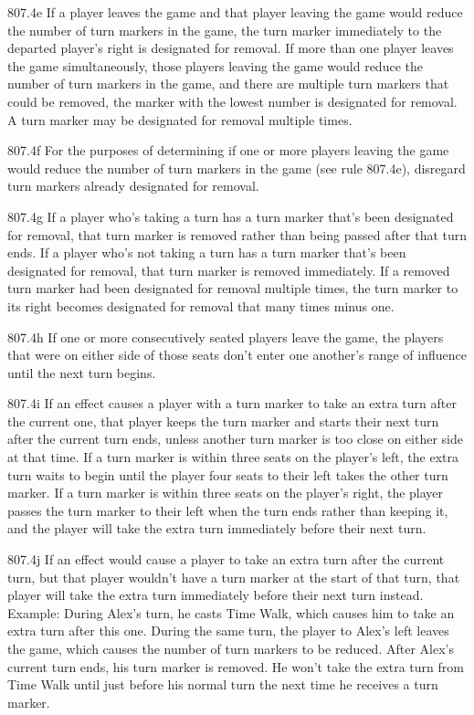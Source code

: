 807.4e If a player leaves the game and that player leaving the game would reduce the number of turn markers in the game, the turn marker immediately to the departed player’s right is designated for removal. If more than one player leaves the game simultaneously, those players leaving the game would reduce the number of turn markers in the game, and there are multiple turn markers that could be removed, the marker with the lowest number is designated for removal. A turn marker may be designated for removal multiple times.

807.4f For the purposes of determining if one or more players leaving the game would reduce the number of turn markers in the game (see rule 807.4e), disregard turn markers already designated for removal.

807.4g If a player who’s taking a turn has a turn marker that’s been designated for removal, that turn marker is removed rather than being passed after that turn ends. If a player who’s not taking a turn has a turn marker that’s been designated for removal, that turn marker is removed immediately. If a removed turn marker had been designated for removal multiple times, the turn marker to its right becomes designated for removal that many times minus one.

807.4h If one or more consecutively seated players leave the game, the players that were on either side of those seats don’t enter one another’s range of influence until the next turn begins.

807.4i If an effect causes a player with a turn marker to take an extra turn after the current one, that player keeps the turn marker and starts their next turn after the current turn ends, unless another turn marker is too close on either side at that time. If a turn marker is within three seats on the player’s left, the extra turn waits to begin until the player four seats to their left takes the other turn marker. If a turn marker is within three seats on the player’s right, the player passes the turn marker to their left when the turn ends rather than keeping it, and the player will take the extra turn immediately before their next turn.

807.4j If an effect would cause a player to take an extra turn after the current turn, but that player wouldn’t have a turn marker at the start of that turn, that player will take the extra turn immediately before their next turn instead.
Example: During Alex’s turn, he casts Time Walk, which causes him to take an extra turn after this one. During the same turn, the player to Alex’s left leaves the game, which causes the number of turn markers to be reduced. After Alex’s current turn ends, his turn marker is removed. He won’t take the extra turn from Time Walk until just before his normal turn the next time he receives a turn marker.

